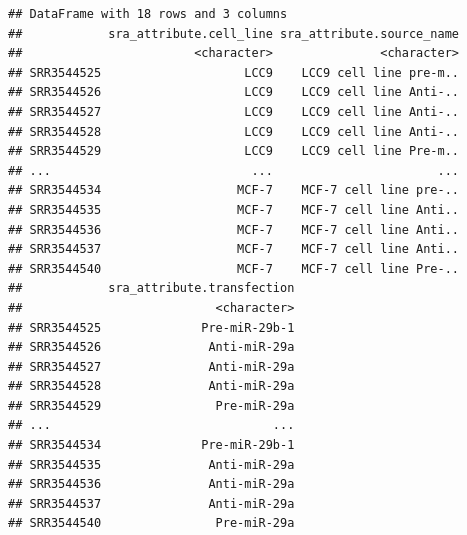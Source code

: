 \documentclass[
]{article}
\newenvironment{Shaded}{\begin{snugshade}}{\end{snugshade}}
\newcommand{\CommentTok}[1]{\textcolor[rgb]{0.56,0.35,0.01}{\textit{#1}}}
\newcommand{\FunctionTok}[1]{\textcolor[rgb]{0.13,0.29,0.53}{\textbf{#1}}}
\newcommand{\NormalTok}[1]{#1}
\newcommand{\OtherTok}[1]{\textcolor[rgb]{0.56,0.35,0.01}{#1}}
\newcommand{\SpecialCharTok}[1]{\textcolor[rgb]{0.81,0.36,0.00}{\textbf{#1}}}
\newcommand{\StringTok}[1]{\textcolor[rgb]{0.31,0.60,0.02}{#1}}
\begin{document}
\begin{verbatim}
## DataFrame with 18 rows and 3 columns
##            sra_attribute.cell_line sra_attribute.source_name
##                        <character>               <character>
## SRR3544525                    LCC9    LCC9 cell line pre-m..
## SRR3544526                    LCC9    LCC9 cell line Anti-..
## SRR3544527                    LCC9    LCC9 cell line Anti-..
## SRR3544528                    LCC9    LCC9 cell line Anti-..
## SRR3544529                    LCC9    LCC9 cell line Pre-m..
## ...                            ...                       ...
## SRR3544534                   MCF-7    MCF-7 cell line pre-..
## SRR3544535                   MCF-7    MCF-7 cell line Anti..
## SRR3544536                   MCF-7    MCF-7 cell line Anti..
## SRR3544537                   MCF-7    MCF-7 cell line Anti..
## SRR3544540                   MCF-7    MCF-7 cell line Pre-..
##            sra_attribute.transfection
##                           <character>
## SRR3544525              Pre-miR-29b-1
## SRR3544526               Anti-miR-29a
## SRR3544527               Anti-miR-29a
## SRR3544528               Anti-miR-29a
## SRR3544529                Pre-miR-29a
## ...                               ...
## SRR3544534              Pre-miR-29b-1
## SRR3544535               Anti-miR-29a
## SRR3544536               Anti-miR-29a
## SRR3544537               Anti-miR-29a
## SRR3544540                Pre-miR-29a
\end{verbatim}

\begin{Shaded}
\end{Shaded}
\end{document}
